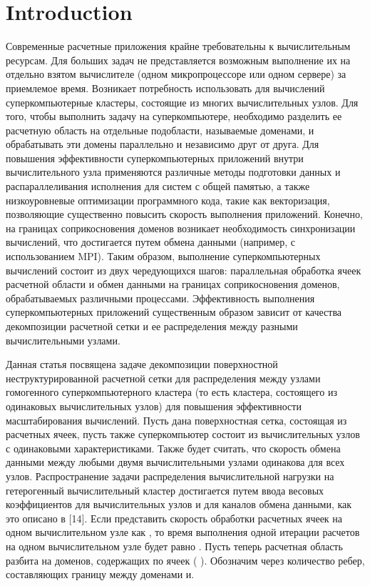 \documentclass[
11pt,%
tightenlines,%
twoside,%
onecolumn,%
nofloats,%
nobibnotes,%
nofootinbib,%
superscriptaddress,%
noshowpacs,%
centertags]%
{revtex4}
\begin{document}
\section{Introduction}

Современные расчетные приложения крайне требовательны к вычислительным ресурсам.
Для больших задач не представляется возможным выполнение их на отдельно взятом вычислителе (одном микропроцессоре или одном сервере) за приемлемое время.
Возникает потребность использовать для вычислений суперкомпьютерные кластеры, состоящие из многих вычислительных узлов.
Для того, чтобы выполнить задачу на суперкомпьютере, необходимо разделить ее расчетную область на отдельные подобласти, называемые доменами, и обрабатывать эти домены параллельно и независимо друг от друга.
Для повышения эффективности суперкомпьютерных приложений внутри вычислительного узла применяются различные методы подготовки данных и распараллеливания исполнения для систем с общей памятью, а также низкоуровневые оптимизации программного кода, такие как векторизация, позволяющие существенно повысить скорость выполнения приложений.
Конечно, на границах соприкосновения доменов возникает необходимость синхронизации вычислений, что достигается путем обмена данными (например, с использованием MPI).
Таким образом, выполнение суперкомпьютерных вычислений состоит из двух чередующихся шагов: параллельная обработка ячеек расчетной области и обмен данными на границах соприкосновения доменов, обрабатываемых различными процессами.
Эффективность выполнения суперкомпьютерных приложений существенным образом зависит от качества декомпозиции расчетной сетки и ее распределения между разными вычислительными узлами.

Данная статья посвящена задаче декомпозиции поверхностной неструктурированной расчетной сетки для распределения между узлами гомогенного суперкомпьютерного кластера (то есть кластера, состоящего из одинаковых вычислительных узлов) для повышения эффективности масштабирования вычислений. Пусть дана поверхностная сетка, состоящая из расчетных ячеек, пусть также суперкомпьютер состоит из   вычислительных узлов с одинаковыми характеристиками. Также будет считать, что скорость обмена данными между любыми двумя вычислительными узлами одинакова для всех узлов. Распространение задачи распределения вычислительной нагрузки на гетерогенный вычислительный кластер достигается путем ввода весовых коэффициентов для вычислительных узлов и для каналов обмена данными, как это описано в [14]. Если представить скорость обработки расчетных ячеек на одном вычислительном узле как  , то время выполнения одной итерации расчетов на одном вычислительном узле будет равно  . Пусть теперь расчетная область разбита на   доменов, содержащих по   ячеек ( ). Обозначим через   количество ребер, составляющих границу между доменами   и.
\end{document}
